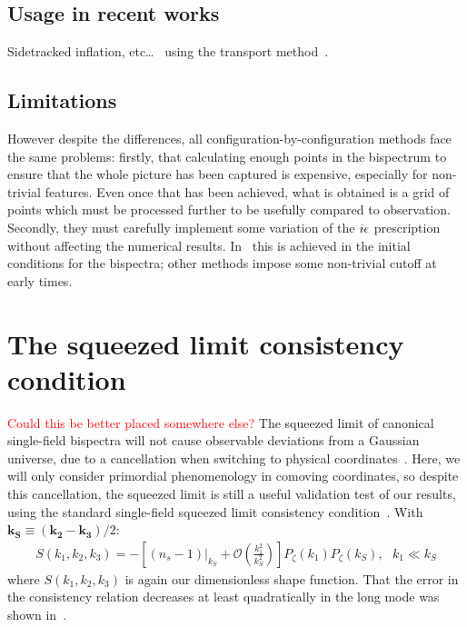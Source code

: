     \subsection{Usage in recent works}
    Sidetracked inflation, etc\ldots~\cite{Fumagalli_2019} using the transport method~\cite{transport_pytransport_2}.
    \subsection{Limitations}
    However despite the differences, all configuration-by-configuration methods face the same problems:
firstly, that calculating enough points in the bispectrum to ensure that
the whole picture has been captured is expensive, especially for non-trivial features.
Even once that has been achieved, what is obtained is a grid of points
which must be processed further to be usefully compared to observation.
Secondly, they must carefully implement some variation
of the $i\epsilon$ prescription without affecting the numerical results.
In~\cite{transport_main} this is achieved in the initial conditions for the bispectra;
other methods impose some non-trivial cutoff at early times.

    \section{The squeezed limit consistency condition}
    \textcolor{red}
    {Could this be better placed somewhere else?}
The squeezed limit of canonical single-field bispectra will not cause
observable deviations from a Gaussian universe,
due to a cancellation when switching to physical coordinates~\cite{Cabass_2016}.
Here, we will only consider primordial phenomenology
in comoving coordinates, so despite this cancellation,
the squeezed limit is still a useful validation test of our results,
using the standard single-field squeezed limit consistency condition~\cite{sqz_consistency,not_so_sqz}.
With $\mathbf{k_S}\equiv\left(\mathbf{k_2}-\mathbf{k_3}\right)/2 $:
\begin{align}\label{eq:sqz_consistency}
    S(k_1,k_2,k_3) = -\left[(n_s-1)|_{k_S}+\mathcal{O}\left(\frac{k_1^2}{k_S^2}\right)\right]P_{\zeta}(k_1)P_{\zeta}(k_S),
\ \ \  k_1\ll k_S
\end{align}
where $S(k_1,k_2,k_3)$ is again our dimensionless shape function.
That the error in the consistency relation decreases at least quadratically
in the long mode was shown in~\cite{not_so_sqz}.

